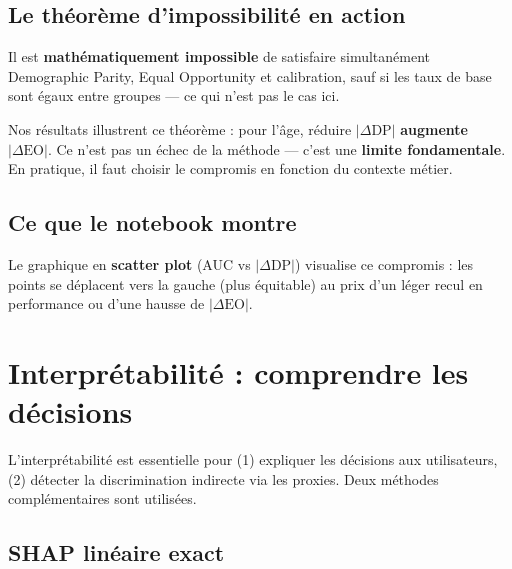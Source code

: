\documentclass[11pt, a4paper]{article}
\begin{document}
\subsection{Le th\'{e}or\`{e}me d'impossibilit\'{e} en action}
\label{sec:impossibility}

\begin{attentionbox}
Il est \textbf{math\'{e}matiquement impossible} de satisfaire simultan\'{e}ment Demographic Parity, Equal Opportunity et calibration, sauf si les taux de base sont \'{e}gaux entre groupes --- ce qui n'est pas le cas ici.
\end{attentionbox}

Nos r\'{e}sultats illustrent ce th\'{e}or\`{e}me : pour l'\^{a}ge, r\'{e}duire $|\Delta\text{DP}|$ \textbf{augmente} $|\Delta\text{EO}|$. Ce n'est pas un \'{e}chec de la m\'{e}thode --- c'est une \textbf{limite fondamentale}. En pratique, il faut choisir le compromis en fonction du contexte m\'{e}tier.

\subsection{Ce que le notebook montre}

Le graphique en \textbf{scatter plot} (AUC vs $|\Delta\text{DP}|$) visualise ce compromis : les points se d\'{e}placent vers la gauche (plus \'{e}quitable) au prix d'un l\'{e}ger recul en performance ou d'une hausse de $|\Delta\text{EO}|$.

\section{Interpr\'{e}tabilit\'{e} : comprendre les d\'{e}cisions}
\label{sec:shap}

\begin{questionbox}
L'interpr\'{e}tabilit\'{e} est essentielle pour (1) expliquer les d\'{e}cisions aux utilisateurs, (2) d\'{e}tecter la discrimination indirecte via les proxies. Deux m\'{e}thodes compl\'{e}mentaires sont utilis\'{e}es.
\end{questionbox}

\subsection{SHAP lin\'{e}aire exact}
\end{document}
